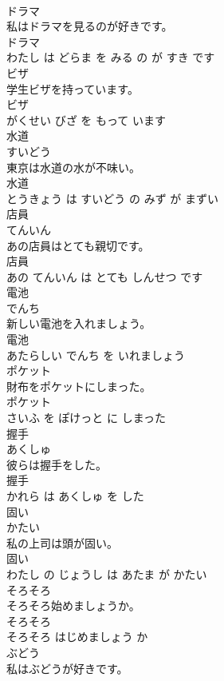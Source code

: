 \documentclass[8pt]{extreport}
\begin{document}
\begin{CJK}{UTF8}{min}
\\	ドラマ	
\\	私はドラマを見るのが好きです。	
\\	ドラマ 
\\	わたし は どらま を みる の が すき です			
\\	ビザ	
\\	学生ビザを持っています。	
\\	ビザ 
\\	がくせい びざ を もって います			
\\	水道	
\\	すいどう			
\\	東京は水道の水が不味い。	
\\	水道 
\\	とうきょう は すいどう の みず が まずい			
\\	店員	
\\	てんいん			
\\	あの店員はとても親切です。	
\\	店員 
\\	あの てんいん は とても しんせつ です			
\\	電池	
\\	でんち			
\\	新しい電池を入れましょう。	
\\	電池 
\\	あたらしい でんち を いれましょう			
\\	ポケット	
\\	財布をポケットにしまった。	
\\	ポケット 
\\	さいふ を ぽけっと に しまった			
\\	握手	
\\	あくしゅ			
\\	彼らは握手をした。	
\\	握手 
\\	かれら は あくしゅ を した			
\\	固い	
\\	かたい			
\\	私の上司は頭が固い。	
\\	固い 
\\	わたし の じょうし は あたま が かたい			
\\	そろそろ	
\\	そろそろ始めましょうか。	
\\	そろそろ 
\\	そろそろ はじめましょう か			
\\	ぶどう	
\\	私はぶどうが好きです。	

\end{CJK}
\end{document}

